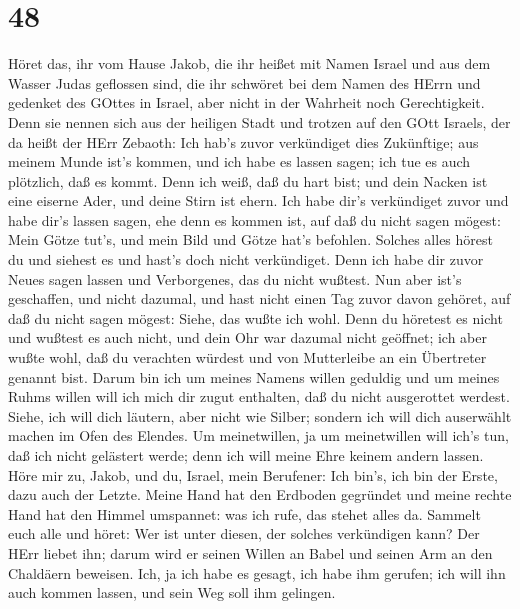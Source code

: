 \hypertarget{section-47}{%
\section{48}\label{section-47}}

 Höret das, ihr vom Hause Jakob, die ihr heißet mit Namen
Israel und aus dem Wasser Judas geflossen sind, die ihr schwöret bei dem
Namen des HErrn und gedenket des GOttes in Israel, aber nicht in der
Wahrheit noch Gerechtigkeit.  Denn sie nennen sich aus der
heiligen Stadt und trotzen auf den GOtt Israels, der da heißt der HErr
Zebaoth:  Ich hab's zuvor verkündiget dies Zukünftige; aus
meinem Munde ist's kommen, und ich habe es lassen sagen; ich tue es auch
plötzlich, daß es kommt.  Denn ich weiß, daß du hart bist;
und dein Nacken ist eine eiserne Ader, und deine Stirn ist ehern.
 Ich habe dir's verkündiget zuvor und habe dir's lassen
sagen, ehe denn es kommen ist, auf daß du nicht sagen mögest: Mein Götze
tut's, und mein Bild und Götze hat's befohlen.  Solches
alles hörest du und siehest es und hast's doch nicht verkündiget. Denn
ich habe dir zuvor Neues sagen lassen und Verborgenes, das du nicht
wußtest.  Nun aber ist's geschaffen, und nicht dazumal, und
hast nicht einen Tag zuvor davon gehöret, auf daß du nicht sagen mögest:
Siehe, das wußte ich wohl.  Denn du höretest es nicht und
wußtest es auch nicht, und dein Ohr war dazumal nicht geöffnet; ich aber
wußte wohl, daß du verachten würdest und von Mutterleibe an ein
Übertreter genannt bist.  Darum bin ich um meines Namens
willen geduldig und um meines Ruhms willen will ich mich dir zugut
enthalten, daß du nicht ausgerottet werdest.  Siehe, ich
will dich läutern, aber nicht wie Silber; sondern ich will dich
auserwählt machen im Ofen des Elendes.  Um meinetwillen, ja
um meinetwillen will ich's tun, daß ich nicht gelästert werde; denn ich
will meine Ehre keinem andern lassen.  Höre mir zu, Jakob,
und du, Israel, mein Berufener: Ich bin's, ich bin der Erste, dazu auch
der Letzte.  Meine Hand hat den Erdboden gegründet und
meine rechte Hand hat den Himmel umspannet: was ich rufe, das stehet
alles da.  Sammelt euch alle und höret: Wer ist unter
diesen, der solches verkündigen kann? Der HErr liebet ihn; darum wird er
seinen Willen an Babel und seinen Arm an den Chaldäern beweisen.
 Ich, ja ich habe es gesagt, ich habe ihm gerufen; ich will
ihn auch kommen lassen, und sein Weg soll ihm gelingen. 
